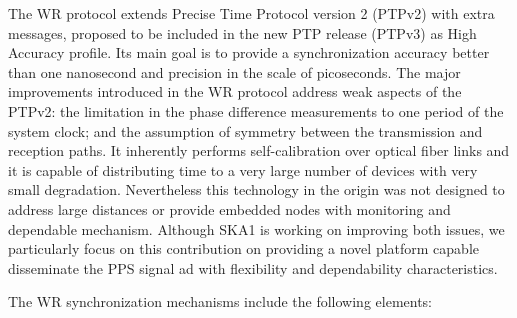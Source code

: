The WR protocol extends Precise Time Protocol version 2 (PTPv2) with extra messages, proposed to be included in the new PTP release (PTPv3) as High Accuracy profile. Its main goal is to provide a synchronization accuracy better than one nanosecond and precision in the scale of picoseconds. The major improvements introduced in the WR protocol address weak aspects of the PTPv2: the limitation in the phase difference measurements to one period of the system clock; and the assumption of symmetry between the transmission and reception paths. It inherently performs self-calibration over optical fiber links and it is capable of distributing time to a very large number of devices with very small degradation. Nevertheless this technology in the origin was not designed to address large distances or provide embedded nodes with monitoring and dependable mechanism. Although SKA1 is working on improving both issues, we particularly focus on this contribution on providing a novel platform capable disseminate the PPS signal ad with flexibility and dependability characteristics.  



The WR synchronization mechanisms include the following elements:

